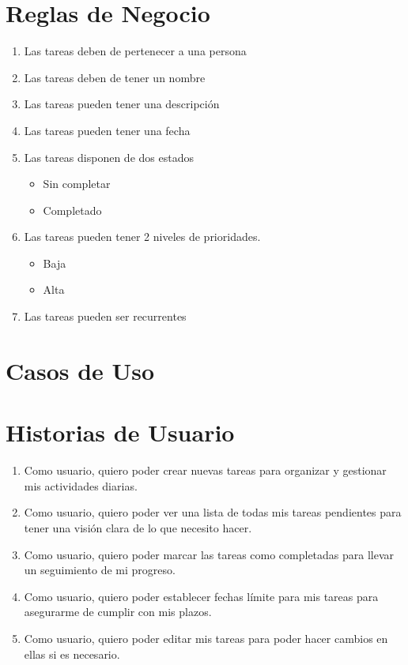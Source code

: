 \section{Reglas de Negocio}
\begin{enumerate}[start=1, label={RN\arabic*.}]
  \item Las tareas deben de pertenecer a una persona \label{rn:user}
  \item Las tareas deben de tener un nombre \label{rn:nombre}
  \item Las tareas pueden tener una descripci\'on \label{rn:desc}
  \item Las tareas pueden tener una fecha \label{rn:fecha}
  \item Las tareas disponen de dos estados \label{rn:estado}
    \begin{itemize}
      \item Sin completar
      \item Completado
    \end{itemize}
  \item Las tareas pueden tener 2 niveles de prioridades. \label{rn:prioridad}
    \begin{itemize}
      \item Baja
      \item Alta
    \end{itemize}
  \item Las tareas pueden ser recurrentes
\end{enumerate}
	\section{Casos de Uso}
	 
    
    \section{Historias de Usuario}
    \begin{enumerate}[start=1, label=HU\arabic*.]
        \item Como usuario, quiero poder crear nuevas tareas para organizar y gestionar mis actividades diarias.
        
        \item Como usuario, quiero poder ver una lista de todas mis tareas pendientes para tener una visión clara de lo que necesito hacer.
        
        \item Como usuario, quiero poder marcar las tareas como completadas para llevar un seguimiento de mi progreso.
        
        \item Como usuario, quiero poder establecer fechas límite para mis tareas para asegurarme de cumplir con mis plazos.

        \item Como usuario, quiero poder editar mis tareas para poder hacer cambios en ellas si es necesario.
    \end{enumerate}
